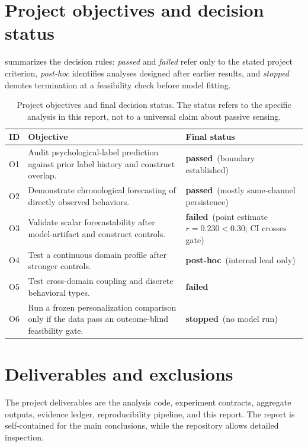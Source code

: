 \documentclass[a4paper,11pt,oneside]{report}
\newcommand{\passed}{\textcolor{statusgreen}{\textbf{passed}}}
\newcommand{\failed}{\textcolor{statusred}{\textbf{failed}}}
\newcommand{\exploratory}{\textcolor{statusorange}{\textbf{post-hoc}}}
\newcommand{\stopped}{\textcolor{statusblue}{\textbf{stopped}}}
\begin{document}
\section{Project objectives and decision status}

 summarizes the decision rules: \emph{passed} and
\emph{failed} refer only to the stated project criterion, \emph{post-hoc} identifies
analyses designed after earlier results, and \emph{stopped} denotes termination at a
feasibility check before model fitting.

\begin{table}[H]
\centering
\caption[Project objectives and final decisions]{Project objectives and final decision status. The status refers to the
specific analysis in this report, not to a universal claim about passive sensing.}
\label{tab:objectives}
\begin{tabularx}{\textwidth}{@{}L{0.06\textwidth}Y L{0.25\textwidth}@{}}
\toprule
ID & Objective & Final status \\
\midrule
O1 & Audit psychological-label prediction against prior label history and
construct overlap. & \passed\ (boundary established) \\
O2 & Demonstrate chronological forecasting of directly observed behaviors. &
\passed\ (mostly same-channel persistence) \\
O3 & Validate scalar forecastability after model-artifact and construct controls. &
\failed\ (point estimate $r=0.230<0.30$; CI crosses gate) \\
O4 & Test a continuous domain profile after stronger controls. & \exploratory\
(internal lead only) \\
O5 & Test cross-domain coupling and discrete behavioral types. & \failed \\
O6 & Run a frozen personalization comparison only if the data pass an outcome-blind
feasibility gate. & \stopped\ (no model run) \\
\bottomrule
\end{tabularx}
\end{table}

\section{Deliverables and exclusions}

The project deliverables are the analysis code, experiment contracts, aggregate
outputs, evidence ledger, reproducibility pipeline, and this report. The report is
self-contained for the main conclusions, while the repository allows detailed
inspection.
\end{document}
